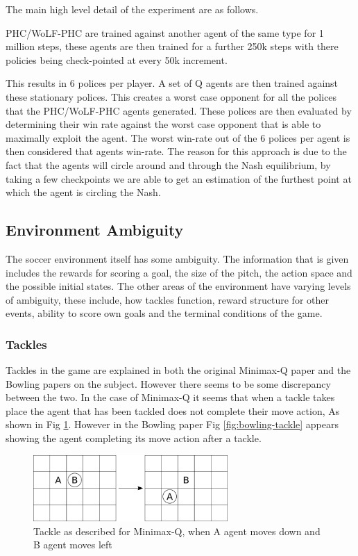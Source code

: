 \documentclass{article}
\begin{document}
The main high level detail of the experiment are as follows.

PHC/WoLF-PHC are trained against another agent of the same type for 1 million steps, these agents are then trained for a further 250k steps with there policies being check-pointed at every 50k increment.

This results in 6 polices per player. A set of Q agents are then trained against these stationary polices. This creates a worst case opponent for all the polices that the PHC/WoLF-PHC agents generated. These polices are then evaluated by determining their win rate against the worst case opponent that is able to maximally exploit the agent. The worst win-rate out of the 6 polices per agent is then considered that agents win-rate. The reason for this approach is due to the fact that the agents will circle around and through the Nash equilibrium, by taking a few checkpoints we are able to get an estimation of the furthest point at which the agent is circling the Nash. 

\subsection*{Environment Ambiguity}

The soccer environment itself has some ambiguity. The information that is given includes the rewards for scoring a goal, the size of the pitch, the action space and the possible initial states. The other areas of the environment have varying levels of ambiguity, these include, how tackles function, reward structure for other events, ability to score own goals and the terminal conditions of the game.

\subsubsection*{Tackles}

Tackles in the game are explained in both the original Minimax-Q paper and the Bowling papers on the subject. However there seems to be some discrepancy between the two. In the case of Minimax-Q it seems that when a tackle takes place the agent that has been tackled does not complete their move action, As shown in Fig \ref{fig:minimax-tackle}. However in the Bowling paper Fig \ref{fig:bowling-tackle} appears showing the agent completing its move action after a tackle. 

\begin{figure}
    \centering
    \includegraphics[width=20em]{./Figures/minimax-tackle.png}
    \caption{Tackle as described for Minimax-Q, when A agent moves down and B agent moves left}
    \label{fig:minimax-tackle}
\end{figure}
\end{document}
